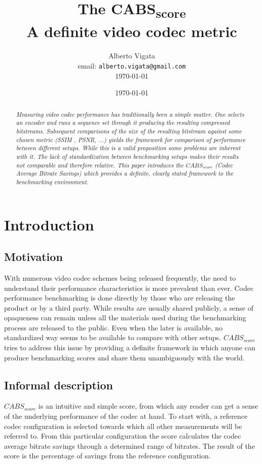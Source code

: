 \documentclass[12pt, conference, hidelinks, onecolumn]{IEEEtran}
\title{The CABS\textsubscript{score} \\ A definite video codec metric}
\author{Alberto Vigata\\ email: {\tt alberto.vigata@gmail.com}\\ \today}
\date{\today}
\begin{document}
    \maketitle
    \vspace{1mm}
    \begin{abstract}
    \textit{
    \noindent
Measuring video codec performance has traditionally been a simple matter. One selects an encoder and runs a sequence set through it producing the resulting compressed bitstreams. Subsequent comparisons of the size of the resulting bitstream against some chosen metric (SSIM \cite{ssim}, PSNR, ...) yields the framework for comparison of performance between different setups. While this is a valid proposition some problems are inherent with it. The lack of standardization between benchmarking setups makes their results not comparable and therefore relative. This paper introduces the $CABS_{score}$ (Codec Average Bitrate Savings) which provides a definite, clearly stated framework to the benchmarking environment.
    }
    \end{abstract}
    \vspace{3mm}



\section{Introduction}


\subsection{Motivation}
	With numerous video codec schemes being released frequently, the need to understand their performance characteristics is more prevalent than ever. Codec performance benchmarking is done directly by those who are releasing the product or by a third party. While results are usually shared publicly, a sense of opaqueness can remain unless all the materials used during the benchmarking process are released to the public. Even when the later is available, no standardized way seems to be available to compare with other setups. $CABS_{score}$ tries to address this issue by providing a definite framework in which anyone can produce benchmarking scores and share them unambiguously with the world.

\subsection{Informal description}
$CABS_{score}$ is an intuitive and simple score, from which any reader can get a sense of the underlying performance of the codec at hand. To start with, a reference codec configuration is selected towards which all other measurements will be referred to. From this particular configuration the score calculates the codec average bitrate savings through a determined range of bitrates. The result of the score is the percentage of savings from the reference configuration.
\end{document}
